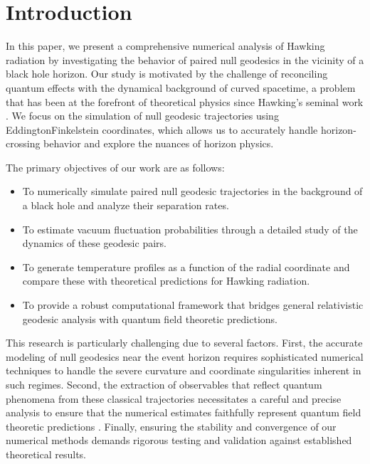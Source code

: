 \documentclass{article}\usepackage[utf8]{inputenc} %
\begin{document}
\section{Introduction}
In this paper, we present a comprehensive numerical analysis of Hawking radiation by investigating the behavior of paired null geodesics in the vicinity of a black hole horizon. Our study is motivated by the challenge of reconciling quantum effects with the dynamical background of curved spacetime, a problem that has been at the forefront of theoretical physics since Hawking's seminal work \cite{Hawking1975}. We focus on the simulation of null geodesic trajectories using Eddington\textendash Finkelstein coordinates, which allows us to accurately handle horizon-crossing behavior and explore the nuances of horizon physics.

The primary objectives of our work are as follows:
\begin{itemize}
    \item To numerically simulate paired null geodesic trajectories in the background of a black hole and analyze their separation rates.
    \item To estimate vacuum fluctuation probabilities through a detailed study of the dynamics of these geodesic pairs.
    \item To generate temperature profiles as a function of the radial coordinate and compare these with theoretical predictions for Hawking radiation.
    \item To provide a robust computational framework that bridges general relativistic geodesic analysis with quantum field theoretic predictions.
\end{itemize}

This research is particularly challenging due to several factors. First, the accurate modeling of null geodesics near the event horizon requires sophisticated numerical techniques to handle the severe curvature and coordinate singularities inherent in such regimes. Second, the extraction of observables that reflect quantum phenomena from these classical trajectories necessitates a careful and precise analysis to ensure that the numerical estimates faithfully represent quantum field theoretic predictions \cite{Jacobson1993}. Finally, ensuring the stability and convergence of our numerical methods demands rigorous testing and validation against established theoretical results.
\end{document}
